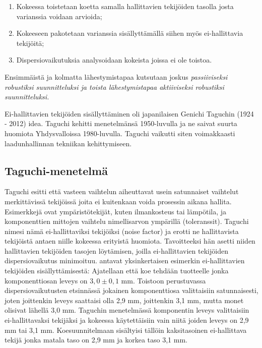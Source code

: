 \documentclass[12pt,a4paper,finnish]{tutthesis}
\begin{document}
\begin{enumerate}  
\item  Kokeessa toistetaan koetta samalla hallittavien tekijöiden
    tasolla josta varianssia voidaan arvioida;
\item Kokeeseen pakotetaan varianssia sisällyttämällä siihen
    myös ei-hallittavia tekijöitä;
\item Dispersiovaikutuksia analysoidaan kokeista joissa ei
    ole toistoa. \parencite{Bursztyn}
\end{enumerate}

Ensimmäistä ja kolmatta lähestymistapaa kutsutaan joskus
\em passiiviseksi \em robustiksi suunnitteluksi ja toista lähestymistapaa
\em aktiiviseksi \em robustiksi suunnitteluksi.

Ei-hallittavien tekijöiden sisällyttäminen oli japanilaisen
Genichi Taguchin (1924 - 2012) idea. Taguchi kehitti menetelmänsä
1950-luvulla ja ne saivat suurta huomiota Yhdysvalloissa 1980-luvulla.
Taguchi vaikutti siten voimakkaasti laadunhallinnan tekniikan kehittymiseen.

\subsection{Taguchi-menetelmä}

Taguchi esitti että vasteen vaihtelun aiheuttavat usein satunnaiset vaihtelut
merkittävissä tekijöissä joita ei kuitenkaan voida prosessin aikana hallita.
Esimerkkejä ovat ympäristötekijät, kuten ilmankosteus tai lämpötila, ja
komponenttien mittojen vaihtelu nimellisarvon ympärillä (toleranssit).
Taguchi nimesi nämä ei-hallittaviksi tekijöiksi (noise factor)
ja erotti ne hallittavista tekijöistä antaen niille kokeessa erityistä
huomiota. Tavoitteeksi hän asetti niiden hallittavien tekijöiden tasojen
löytämisen, joilla ei-hallittavien tekijöiden dispersiovaikutus minimoituu.
\textcite{Bursztyn} antavat yksinkertaisen esimerkin ei-hallittavien tekijöiden
sisällyttämisestä: Ajatellaan että koe tehdään tuotteelle jonka
komponenttiosan leveys on \(3,0 \pm 0,1\) mm.
Toistoon perustuvassa dispersiovaikutusten etsinnässä jokainen
komponenttiosa valittaisiin satunnaisesti, joten joittenkin leveys
saattaisi olla 2,9 mm, joittenkin 3,1 mm, mutta monet olisivat lähellä
3,0 mm. Taguchin menetelmässä komponentin leveys valittaisiin
ei-hallittavaksi tekijäksi ja kokeessa käytettäisiin vain niitä joiden
leveys on 2,9 mm tai 3,1 mm. Koesuunnitelmaan sisältyisi tällöin
kaksitasoinen ei-hallittava tekijä jonka matala taso on 2,9 mm ja
korkea taso 3,1 mm.
\end{document}

